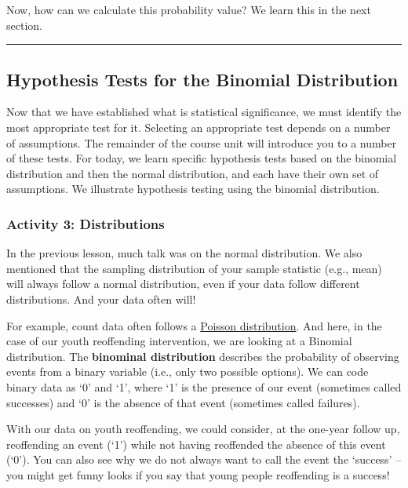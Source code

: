 \documentclass[
]{book}
\begin{document}
Now, how can we calculate this probability value? We learn this in the next section.

\begin{center}\rule{0.5\linewidth}{0.5pt}\end{center}

\hypertarget{hypothesis-tests-for-the-binomial-distribution}{%
\subsection{Hypothesis Tests for the Binomial Distribution}\label{hypothesis-tests-for-the-binomial-distribution}}

Now that we have established what is statistical significance, we must identify the most appropriate test for it. Selecting an appropriate test depends on a number of assumptions. The remainder of the course unit will introduce you to a number of these tests. For today, we learn specific hypothesis tests based on the binomial distribution and then the normal distribution, and each have their own set of assumptions. We illustrate hypothesis testing using the binomial distribution.

\hypertarget{activity-3-distributions}{%
\subsubsection{Activity 3: Distributions}\label{activity-3-distributions}}

In the previous lesson, much talk was on the normal distribution. We also mentioned that the sampling distribution of your sample statistic (e.g., mean) will always follow a normal distribution, even if your data follow different distributions. And your data often will!

For example, count data often follows a \href{https://bookdown.org/gabriel_butler/ECON41Labs/tutorial-5-the-poisson-distribution.html}{Poisson distribution}. And here, in the case of our youth reoffending intervention, we are looking at a Binomial distribution. The \textbf{binominal distribution} describes the probability of observing events from a binary variable (i.e., only two possible options). We can code binary data as `0' and `1', where `1' is the presence of our event (sometimes called successes) and `0' is the absence of that event (sometimes called failures).

With our data on youth reoffending, we could consider, at the one-year follow up, reoffending an event (`1') while not having reoffended the absence of this event (`0'). You can also see why we do not always want to call the event the `success' -- you might get funny looks if you say that young people reoffending is a success!
\end{document}
